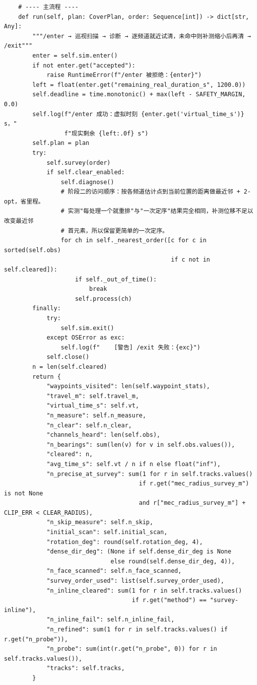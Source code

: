 \documentclass[UTF8, zihao=5,AutoFakeBold=2]{ctexart}
\begin{document}
\begin{lstlisting}
    # ---- 主流程 ----
    def run(self, plan: CoverPlan, order: Sequence[int]) -> dict[str, Any]:
        """/enter → 巡视扫描 → 诊断 → 逐频道就近试清，未命中则补测缩小后再清 → /exit"""
        enter = self.sim.enter()
        if not enter.get("accepted"):
            raise RuntimeError(f"/enter 被拒绝：{enter}")
        left = float(enter.get("remaining_real_duration_s", 1200.0))
        self.deadline = time.monotonic() + max(left - SAFETY_MARGIN, 0.0)
        self.log(f"/enter 成功：虚拟时刻 {enter.get('virtual_time_s')} s，"
                 f"现实剩余 {left:.0f} s")
        self.plan = plan
        try:
            self.survey(order)
            if self.clear_enabled:
                self.diagnose()
                # 阶段二的访问顺序：按各频道估计点到当前位置的距离做最近邻 + 2-opt，省里程。
                # 实测"每处理一个就重排"与"一次定序"结果完全相同，补测位移不足以改变最近邻
                # 首元素，所以保留更简单的一次定序。
                for ch in self._nearest_order([c for c in sorted(self.obs)
                                               if c not in self.cleared]):
                    if self._out_of_time():
                        break
                    self.process(ch)
        finally:
            try:
                self.sim.exit()
            except OSError as exc:
                self.log(f"    [警告] /exit 失败：{exc}")
            self.close()
        n = len(self.cleared)
        return {
            "waypoints_visited": len(self.waypoint_stats),
            "travel_m": self.travel_m,
            "virtual_time_s": self.vt,
            "n_measure": self.n_measure,
            "n_clear": self.n_clear,
            "channels_heard": len(self.obs),
            "n_bearings": sum(len(v) for v in self.obs.values()),
            "cleared": n,
            "avg_time_s": self.vt / n if n else float("inf"),
            "n_precise_at_survey": sum(1 for r in self.tracks.values()
                                      if r.get("mec_radius_survey_m") is not None
                                      and r["mec_radius_survey_m"] + CLIP_ERR < CLEAR_RADIUS),
            "n_skip_measure": self.n_skip,
            "initial_scan": self.initial_scan,
            "rotation_deg": round(self.rotation_deg, 4),
            "dense_dir_deg": (None if self.dense_dir_deg is None
                              else round(self.dense_dir_deg, 4)),
            "n_face_scanned": self.n_face_scanned,
            "survey_order_used": list(self.survey_order_used),
            "n_inline_cleared": sum(1 for r in self.tracks.values()
                                    if r.get("method") == "survey-inline"),
            "n_inline_fail": self.n_inline_fail,
            "n_refined": sum(1 for r in self.tracks.values() if r.get("n_probe")),
            "n_probe": sum(int(r.get("n_probe", 0)) for r in self.tracks.values()),
            "tracks": self.tracks,
        }
	\end{lstlisting}
\end{document}
